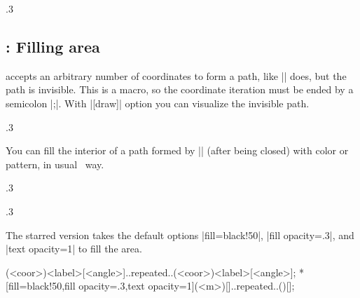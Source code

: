 \begin{tzcode}{.3}
\end{tzcode}

\subsection{\protect\cmd{\tzpath*}: Filling area}
\label{ssi:tzpath}

\icmd{\tzpath} accepts an arbitrary number of coordinates to form a path, like |\tzlines| does, but the path is invisible. This is a  macro, so the coordinate iteration must be ended by a semicolon |;|.
With |[draw]| option you can visualize the invisible path.

\begin{tzcode}{.3}
\end{tzcode}

You can fill the interior of a path formed by |\tzpath| (after being closed) with color or pattern, in usual \Tikz\ way.

\begin{tzcode}{.3}
\end{tzcode}

\begin{tzcode}{.3}
\end{tzcode}



The starred version \icmd{\tzpath*} takes the default options |fill=black!50|, |fill opacity=.3|, and |text opacity=1| to fill the area.

\begin{tzdef}{}
\tzpath*[<opt>](<coor>){<label>}[<angle>]..repeated..(<coor>){<label>}[<angle>];
 *[fill=black!50,fill opacity=.3,text opacity=1](<m>){}[]..repeated..(){}[];
\end{tzdef}

